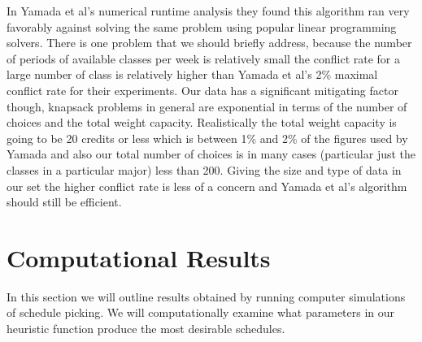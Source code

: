 \documentclass[11pt]{article} %
\begin{document}
In Yamada et al’s \cite{yamada:heuristic} numerical runtime analysis they found
this algorithm ran very favorably against solving the same problem using popular
linear programming solvers. There is one problem that we should briefly address,
because the number of periods of available classes per week is relatively small
the conflict rate for a large number of class is relatively higher than Yamada
et al’s 2\% maximal conflict rate for their experiments. Our data has
a significant mitigating factor though, knapsack problems in general are
exponential in terms of the number of choices and the total weight capacity.
Realistically the total weight capacity is going to be 20 credits or less which
is between 1\% and 2\% of the figures used by Yamada \cite{yamada:heuristic} and
also our total number of choices is in many cases (particular just the classes
in a particular major) less than 200. Giving the size and type of data in our
set the higher conflict rate is less of a concern and Yamada et al’s algorithm
should still be efficient.

\section{Computational Results} In this section we will outline results obtained
by running computer simulations of schedule picking. We will computationally
examine what parameters in our heuristic function produce the most desirable
schedules.

{}  
\end{document}
